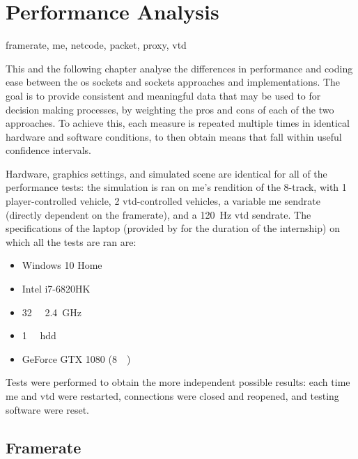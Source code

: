 \chapter{Performance Analysis}\label{ch:performance}

\begin{keywords}
	framerate, me, netcode, packet, proxy, vtd
\end{keywords}

This and the following chapter analyse the differences in performance and coding ease between the \gls{os} sockets and  sockets approaches and implementations. The goal is to provide consistent and meaningful data that may be used to for decision making processes, by weighting the pros and cons of each of the two approaches. To achieve this, each measure is repeated multiple times in identical hardware and software conditions, to then obtain means that fall within useful confidence intervals.

Hardware, graphics settings, and simulated scene are identical for all of the performance tests: the simulation is ran on \gls{me}'s rendition of the 8-track, with \num{1} player-controlled vehicle, \num{2} \gls{vtd}-controlled vehicles, a variable \gls{me} \gls{sendrate} (directly dependent on the \gls{framerate}), and a \SI{120}{\hertz} \gls{vtd} \gls{sendrate}. The specifications of the  laptop (provided by  for the duration of the internship) on which all the tests are ran are:

\begin{itemize}
	\item Windows 10 Home
	\item Intel i7-6820HK
	\item \SI{32}{\giga\byte} \SI{2.4}{\giga\hertz}
	\item \SI{1}{\tera\byte} \acrshort{hdd}
	\item GeForce GTX 1080 (\SI{8}{\giga\byte})
\end{itemize}

Tests were performed to obtain the more independent possible results: each time \gls{me} and \gls{vtd} were restarted, connections were closed and reopened, and testing software were reset.

\section{Framerate}\label{sc:performance:framerate}

